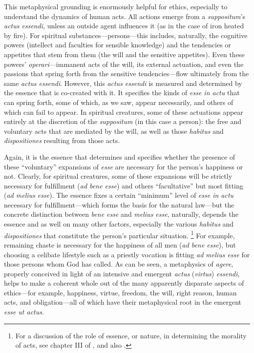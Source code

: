 This metaphysical grounding is enormously helpful for ethics, especially to understand the dynamics of human acts. All actions emerge from a \emph{suppositum}'s \emph{actus essendi}, unless an outside agent influences it (as in the case of iron heated by fire). For spiritual substances---persons---this includes, naturally, the cognitive powers (intellect and faculties for sensible knowledge) and the tendencies or appetites that stem from them (the will and the sensitive appetites). Even these powers' \emph{operari}---immanent acts of the will, its external actuation, and even the passions that spring forth from the sensitive tendencies---flow ultimately from the same \emph{actus essendi}. However, this \emph{actus essendi} is measured and determined by the essence that is co-created with it. It specifies the kinds of \emph{esse in actu} that can spring forth, some of which, as we saw, appear necessarily, and others of which can fail to appear. In spiritual creatures, some of these actuations appear entirely at the discretion of the \emph{suppositum} (in this case a person): the free and voluntary acts that are mediated by the will, as well as those \emph{habitus} and \emph{dispositiones} resulting from those acts.

Again, it is the essence that determines and specifies whether the presence of these ``voluntary'' expansions of \emph{esse} are necessary for the person's happiness or not. Clearly, for spiritual creatures, some of these expansions will be strictly necessary for fulfillment (\emph{ad bene esse}) and others ``facultative'' but most fitting (\emph{ad melius esse}). The essence fixes a certain ``minimum'' level of \emph{esse in actu} necessary for fulfillment---which forms the basis for the natural law---but the concrete distinction between \emph{bene esse} and \emph{melius esse}, naturally, depends the essence and as well on many other factors, especially the various \emph{habitus} and \emph{dispositiones} that constitute the person's particular situation.%
%
\footnote{For a discussion of the role of essence, or nature, in determining the morality of acts, see chapter III of \cite[31--44]{lucas:absoluto}, and also \cite[459--475]{millan-puelles:libre}.}
%
For example, remaining chaste is necessary for the happiness of all men (\emph{ad bene esse}), but choosing a celibate lifestyle such as a priestly vocation is fitting \emph{ad melius esse} for those persons whom God has called. As can be seen, a metaphysics of \emph{agere}, properly conceived in light of an intensive and emergent \emph{actus} (\emph{virtus}) \emph{essendi}, helps to make a coherent whole out of the many apparently disparate aspects of ethics---for example, happiness, virtue, freedom, the will, right reason, human acts, and obligation---all of which have their metaphysical root in the emergent \emph{esse ut actus}.

